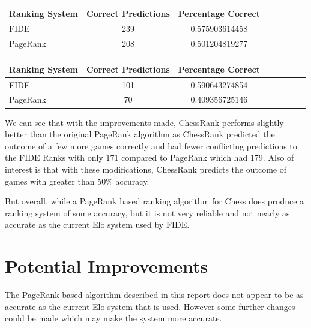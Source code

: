 \documentclass[pdftex,11pt,a4paper]{report}
\begin{document}
\begin{singlespace}
\begin{tabular}{l*{6}{c}r}
Ranking System & Correct Predictions & Percentage Correct \\ 
\hline

FIDE & 239 & 0.575903614458 \\
PageRank & 208 & 0.501204819277 \\

\end{tabular}
\end{singlespace}

\begin{singlespace}
\begin{tabular}{l*{6}{c}r}
Ranking System & Correct Predictions & Percentage Correct \\ 
\hline

FIDE &  101 & 0.590643274854 \\
PageRank &  70 & 0.409356725146 \\

\end{tabular}
\end{singlespace}

We can see that with the improvements made,
   ChessRank performs slightly better than the original PageRank algorithm as ChessRank predicted the outcome of a few more games correctly and had fewer 
conflicting predictions to the FIDE Ranks with only 171 compared to PageRank which had 179. Also of interest is that
with these modifications, ChessRank predicts the outcome of games with greater than 50\% accuracy.

But overall, while a PageRank based ranking algorithm for Chess does produce a ranking system
of some accuracy, but it is not very reliable and not nearly as accurate as the current Elo system used by FIDE.





\chapter{Potential Improvements}

The PageRank based algorithm described in this report does not appear to be as accurate as the current Elo
system that is used. However some further changes could be made which may make the system more accurate.
\end{document}
